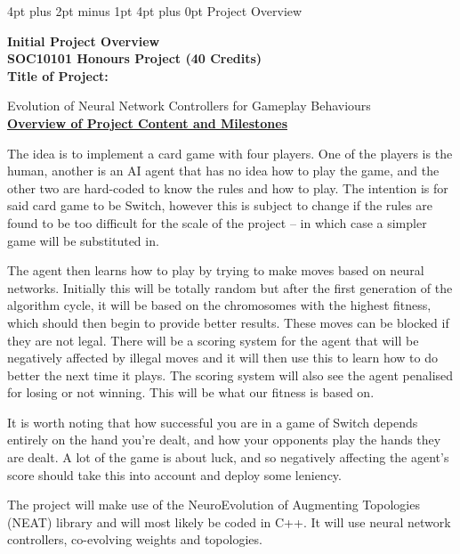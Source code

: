 \documentclass[12pt,a4paper]{article}
\makeatletter
\renewcommand\section{\@startsection {section}{1}{0mm} %
                               {4pt plus 2pt minus 1pt} %
                               {4pt plus 0pt} %
                               {\bfseries}}
\makeatother
\begin{document}
\newpage
\renewcommand{\thepage}{}
\begin{appendices}
\section{Project Overview}

\Large{\textbf{Initial Project Overview}\\

\textbf{SOC10101 Honours Project (40 Credits)}}\\                                                      

\large{\textbf{Title of Project:}}

\normalsize{Evolution of Neural Network Controllers for Gameplay Behaviours} \\

\underline{\textbf{Overview of Project Content and Milestones}}

The idea is to implement a card game with four players. One of the players is the human, another is an AI agent that has no idea how to play the game, and the other two are hard-coded to know the rules and how to play. The intention is for said card game to be Switch, however this is subject to change if the rules are found to be too difficult for the scale of the project – in which case a simpler game will be substituted in.


The agent then learns how to play by trying to make moves based on neural networks. Initially this will be totally random but after the first generation of the algorithm cycle, it will be based on the chromosomes with the highest fitness, which should then begin to provide better results. These moves can be blocked if they are not legal. There will be a scoring system for the agent that will be negatively affected by illegal moves and it will then use this to learn how to do better the next time it plays. The scoring system will also see the agent penalised for losing or not winning. This will be what our fitness is based on. 


It is worth noting that how successful you are in a game of Switch depends entirely on the hand you’re dealt, and how your opponents play the hands they are dealt. A lot of the game is about luck, and so negatively affecting the agent’s score should take this into account and deploy some leniency. 


The project will make use of the NeuroEvolution of Augmenting Topologies (NEAT) library and will most likely be coded in C++. It will use neural network controllers, co-evolving weights and topologies. \\


\end{appendices}
\end{document}
